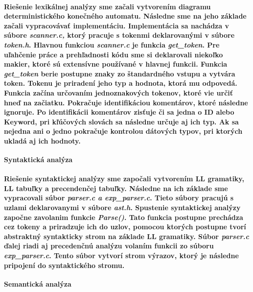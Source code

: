 \documentclass[12pt]{article}
\begin{document}
\paragraph{\indent Riešenie lexikálnej analýzy sme začali vytvorením diagramu deterministického konečného automatu. Následne sme na jeho základe začali vypracovávať implementáciu. Implementácia sa nachádza v súbore \textit{scanner.c,} ktorý pracuje s tokenmi deklarovanými v súbore \textit{token.h}. Hlavnou funkciou \textit{scanner.c} je funkcia \textit{get\_token}. Pre uľahčenie práce a prehľadnosti kódu sme si deklarovali niekoľko makier, ktoré sú extensívne používané v hlavnej funkcii. Funkcia \textit{get\_token} berie postupne znaky zo štandardného vstupu a vytvára token. Tokenu je priradení jeho typ a hodnota, ktorá mu odpovedá. Funkcia začína určovaním jednoznakových tokenov, ktoré vie určiť hneď na začiatku. Pokračuje identifikáciou komentárov, ktoré následne ignoruje. Po identifikácii komentárov zisťuje či sa jedna o ID alebo Keyword, pri kľúčových slovách sa následne určuje aj ich typ. Ak sa nejedna ani o jedno pokračuje kontrolou dátových typov, pri ktorých ukladá aj ich hodnoty.  \newline \\}

 \Large \textbf{Syntaktická analýza}\normalsize \\
\noindent\makebox[\linewidth]{\rule{\textwidth}{0.4pt}}

\paragraph{Riešenie syntaktickej analýzy sme započali vytvorením LL gramatiky, LL tabuľky a precendenčej tabuľky. Následne na ich základe sme vypracovali súbor \textit{parser.c a exp\_parser.c}. Tieto súbory pracujú s uzlami deklarovanymi v súbore \textit{ast.h}. Spustenie syntaktickej analýzy započne zavolanim funkcie \textit{Parse()}. Tato funkcia postupne prechádza cez tokeny a priradzuje ich do uzlov, pomocou ktorých postupne tvorí abstraktný syntakticky strom na základe LL gramatiky. Súbor \textit{parser.c} ďalej riadi aj precedenčnú analýzu volaním funkcii zo súboru \textit{exp\_parser.c}. Tento súbor vytvorí strom výrazov, ktorý je následne pripojení do syntaktického stromu.  \newline \\}

 \Large \textbf{Semantická analýza}\normalsize \\
\noindent\makebox[\linewidth]{\rule{\textwidth}{0.4pt}}
\end{document}
